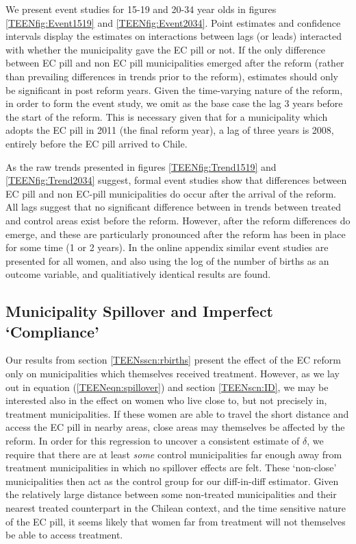 We present event studies for 15-19 and 20-34 year olds in figures 
\ref{TEENfig:Event1519} and \ref{TEENfig:Event2034}.  Point estimates and 
confidence intervals display the estimates on interactions between lags (or 
leads) interacted with whether the municipality gave the EC pill or not.  If the
only difference between EC pill and non EC pill municipalities emerged after the
reform (rather than prevailing differences in trends prior to the reform), 
estimates should only be significant in post reform years. Given the time-varying
nature of the reform, in order to form the event study, we omit as the base case
the lag 3 years before the start of the reform.  This is necessary given that for
a municipality which adopts the EC pill in 2011 (the final reform year), a lag of
three years is 2008, entirely before the EC pill arrived to Chile.

As the raw trends presented in figures \ref{TEENfig:Trend1519} and 
\ref{TEENfig:Trend2034} suggest, formal event studies show that differences 
between EC pill and non EC-pill municipalities do occur after the arrival of the
reform.  All lags suggest that no significant difference between in trends
between treated and control areas exist before the reform.  However, after the
reform differences do emerge, and these are particularly pronounced after the
reform has been in place for some time (1 or 2 years).  In the online appendix
similar event studies are presented for all women, and also using the log of the
number of births as an outcome variable, and qualitiatively identical results are
found.

\subsection{Municipality Spillover and Imperfect `Compliance'}
\label{TEENsscn:spillover}
Our results from section \ref{TEENsscn:rbirths} present the effect of the EC
reform only on municipalities which themselves received treatment.  However,
as we lay out in equation (\ref{TEENeqn:spillover}) and section \ref{TEENscn:ID},
we may be interested also in the effect on women who live close to, but not
precisely in, treatment municipalities.  If these women are able to travel the
short distance and access the EC pill in nearby areas, close areas may themselves
be affected by the reform.  In order for this regression to uncover a consistent
estimate of $\delta$, we require that there are at least \emph{some} control
municipalities far enough away from treatment municipalities in which no spillover
effects are felt.  These `non-close' municipalities then act as the control group
for our diff-in-diff estimator.  Given the relatively large distance between some
non-treated municipalities and their nearest treated counterpart in the Chilean
context, and the time sensitive nature of the EC pill, it seems likely that women
far from treatment will not themselves be able to access treatment.

